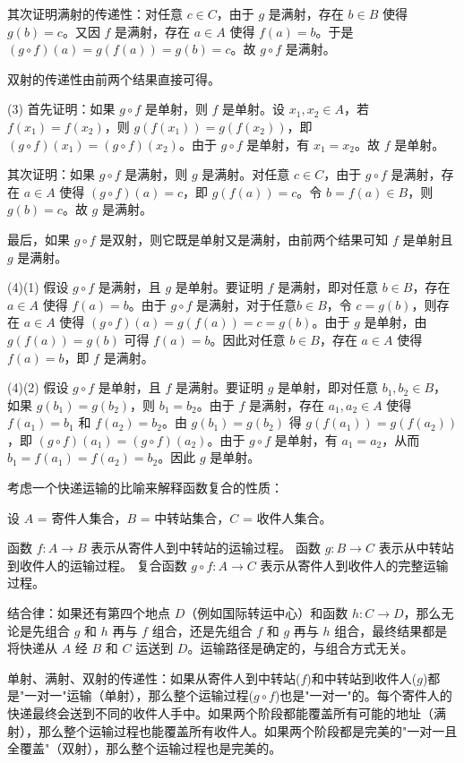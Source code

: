 \documentclass[lang=cn,11pt]{elegantbook}
\begin{document}
其次证明满射的传递性：对任意 $c \in C$，由于 $g$ 是满射，存在 $b \in B$ 使得 $g(b) = c$。又因 $f$ 是满射，存在 $a \in A$ 使得 $f(a) = b$。于是 $(g \circ f)(a) = g(f(a)) = g(b) = c$。故 $g \circ f$ 是满射。

双射的传递性由前两个结果直接可得。

(3) 首先证明：如果 $g \circ f$ 是单射，则 $f$ 是单射。设 $x_1, x_2 \in A$，若 $f(x_1) = f(x_2)$，则 $g(f(x_1)) = g(f(x_2))$，即 $(g \circ f)(x_1) = (g \circ f)(x_2)$。由于 $g \circ f$ 是单射，有 $x_1 = x_2$。故 $f$ 是单射。

其次证明：如果 $g \circ f$ 是满射，则 $g$ 是满射。对任意 $c \in C$，由于 $g \circ f$ 是满射，存在 $a \in A$ 使得 $(g \circ f)(a) = c$，即 $g(f(a)) = c$。令 $b = f(a) \in B$，则 $g(b) = c$。故 $g$ 是满射。

最后，如果 $g \circ f$ 是双射，则它既是单射又是满射，由前两个结果可知 $f$ 是单射且 $g$ 是满射。

(4)(1) 假设 $g \circ f$ 是满射，且 $g$ 是单射。要证明 $f$ 是满射，即对任意 $b \in B$，存在 $a \in A$ 使得 $f(a) = b$。由于 $g \circ f$ 是满射，对于任意$b \in B$，令 $c = g(b)$，则存在 $a \in A$ 使得 $(g \circ f)(a) =g(f(a))= c=g(b)$。由于 $g$ 是单射，由 $g(f(a)) = g(b)$ 可得 $f(a) = b$。因此对任意 $b \in B$，存在 $a \in A$ 使得 $f(a) = b$，即 $f$ 是满射。

(4)(2) 假设 $g \circ f$ 是单射，且 $f$ 是满射。要证明 $g$ 是单射，即对任意 $b_1, b_2 \in B$，如果 $g(b_1) = g(b_2)$，则 $b_1 = b_2$。由于 $f$ 是满射，存在 $a_1, a_2 \in A$ 使得 $f(a_1) = b_1$ 和 $f(a_2) = b_2$。由 $g(b_1) = g(b_2)$ 得 $g(f(a_1)) = g(f(a_2))$，即 $(g \circ f)(a_1) = (g \circ f)(a_2)$。由于 $g \circ f$ 是单射，有 $a_1 = a_2$，从而 $b_1 = f(a_1) = f(a_2) = b_2$。因此 $g$ 是单射。
\vspace{20pt}

考虑一个快递运输的比喻来解释函数复合的性质：

设 $A$ = 寄件人集合，$B$ = 中转站集合，$C$ = 收件人集合。

函数 $f: A \to B$ 表示从寄件人到中转站的运输过程。
函数 $g: B \to C$ 表示从中转站到收件人的运输过程。
复合函数 $g \circ f: A \to C$ 表示从寄件人到收件人的完整运输过程。

结合律：如果还有第四个地点 $D$（例如国际转运中心）和函数 $h: C \to D$，那么无论是先组合 $g$ 和 $h$ 再与 $f$ 组合，还是先组合 $f$ 和 $g$ 再与 $h$ 组合，最终结果都是将快递从 $A$ 经 $B$ 和 $C$ 运送到 $D$。运输路径是确定的，与组合方式无关。

单射、满射、双射的传递性：如果从寄件人到中转站($f$)和中转站到收件人($g$)都是"一对一"运输（单射），那么整个运输过程($g \circ f$)也是"一对一"的。每个寄件人的快递最终会送到不同的收件人手中。如果两个阶段都能覆盖所有可能的地址（满射），那么整个运输过程也能覆盖所有收件人。如果两个阶段都是完美的"一对一且全覆盖"（双射），那么整个运输过程也是完美的。
\end{document}
